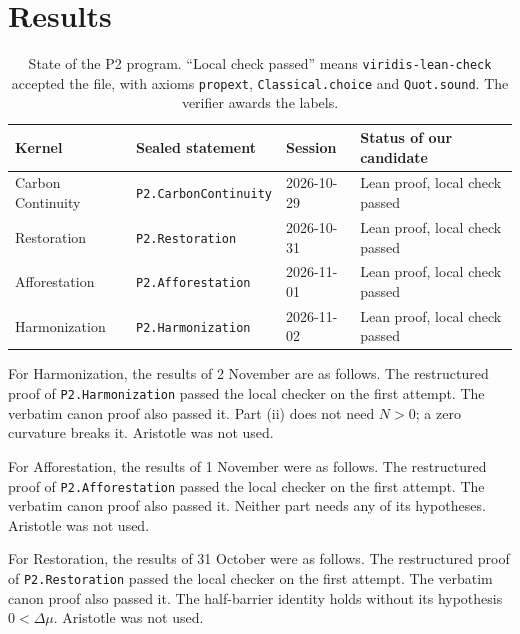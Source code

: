 \documentclass[11pt]{article}
\theoremstyle{definition}
\theoremstyle{remark}
\begin{document}
\section{Results}
\begin{table}[h]
\centering\small
\begin{tabular}{@{}llll@{}}
\toprule
Kernel & Sealed statement & Session & Status of our candidate \\
\midrule
Carbon Continuity & \texttt{P2.CarbonContinuity} & 2026-10-29 & Lean proof, local check passed \\
Restoration & \texttt{P2.Restoration} & 2026-10-31 & Lean proof, local check passed \\
Afforestation & \texttt{P2.Afforestation} & 2026-11-01 & Lean proof, local check passed \\
Harmonization & \texttt{P2.Harmonization} & 2026-11-02 & Lean proof, local check passed \\
\bottomrule
\end{tabular}
\caption{State of the P2 program. ``Local check passed'' means \texttt{viridis-lean-check} accepted the file, with axioms
\texttt{propext}, \texttt{Classical.choice} and \texttt{Quot.sound}. The verifier awards the labels.}
\end{table}
For Harmonization, the results of 2 November are as follows.
The restructured proof of \texttt{P2.Harmonization} passed the local checker on the first attempt.
The verbatim canon proof also passed it. Part (ii) does not need $N>0$; a zero curvature breaks it.
Aristotle was not used.

For Afforestation, the results of 1 November were as follows.
The restructured proof of \texttt{P2.Afforestation} passed the local checker on the first attempt.
The verbatim canon proof also passed it. Neither part needs any of its hypotheses.
Aristotle was not used.

For Restoration, the results of 31 October were as follows.
The restructured proof of \texttt{P2.Restoration} passed the local checker on the first attempt.
The verbatim canon proof also passed it.
The half-barrier identity holds without its hypothesis $0<\Delta\mu$.
Aristotle was not used.
\end{document}
